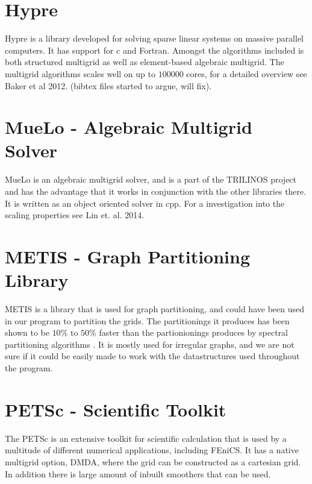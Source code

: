 \section{Hypre}
Hypre is a library developed for solving sparse linear systems on massive parallel computers. It has support for c and Fortran. Amongst the algorithms included is both structured multigrid as well as element-based algebraic multigrid. The multigrid algorithms scales well on up to \(100 000\) cores, for a detailed overview see Baker et al 2012. (bibtex files started to argue, will fix).

\section{MueLo - Algebraic Multigrid Solver}
MueLo is an algebraic multigrid solver, and is a part of the TRILINOS project and has the advantage that it works in conjunction with the other libraries there. It is written as an object oriented solver in cpp. For a investigation into the scaling properties see Lin et. al. 2014.


\section{METIS - Graph Partitioning Library}
METIS is a library that is used for graph partitioning, and could have been used in our program to partition the grids. The partitionings it produces has been shown to be \(10\%\) to \(50\%\) faster than the partionionings produces by spectral partitioning algorithms \citep{_fast_????}. It is mostly used for irregular graphs, and we are not sure if it could be easily made to work with the datastructures used throughout the program.


\section{PETSc - Scientific Toolkit}
The PETSc is an extensive toolkit for scientific calculation that is used by a multitude of different numerical applications, including FEniCS. It has a native multigrid option, DMDA, where the grid can be constructed as a cartesian grid. In addition there is large amount of inbuilt smoothers that can be used.
